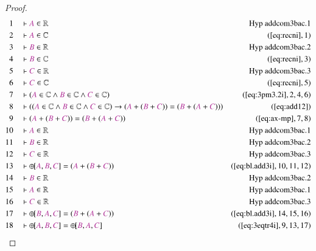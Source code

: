 \begin{proof}
\begin{align}
  1 &&  & \vdash \mc{A} \in
\mathbb{R}&\text{Hyp~addcom3bac.1}\notag%
  \\ 2 &&  & \vdash \mc{A} \in \mathbb{C}&(\mbox{\ref{eq:recni}},1)\notag
  \\ 3 &&  & \vdash \mc{B} \in
\mathbb{R}&\text{Hyp~addcom3bac.2}\notag%
  \\ 4 &&  & \vdash \mc{B} \in \mathbb{C}&(\mbox{\ref{eq:recni}},3)\notag
  \\ 5 &&  & \vdash \mc{C} \in
\mathbb{R}&\text{Hyp~addcom3bac.3}\notag%
  \\ 6 &&  & \vdash \mc{C} \in \mathbb{C}&(\mbox{\ref{eq:recni}},5)\notag
  \\ 7 &&  & \vdash ( \mc{A} \in \mathbb{C} \wedge \mc{B} \in \mathbb{C} \wedge
      \mc{C} \in \mathbb{C}
      )&(\mbox{\ref{eq:3pm3.2i}},2,4,6)\notag
  \\ 8 &&  & \vdash ( ( \mc{A} \in \mathbb{C} \wedge \mc{B} \in \mathbb{C}
      \wedge \mc{C} \in \mathbb{C} ) \rightarrow ( \mc{A} +
      ( \mc{B} + \mc{C} ) ) = ( \mc{B} + ( \mc{A} + \mc{C}
      ) ) )&(\mbox{\ref{eq:add12}})\notag
  \\ 9 &&  & \vdash ( \mc{A} + ( \mc{B} + \mc{C} ) ) = ( \mc{B} + ( \mc{A} +
      \mc{C} ) )&(\mbox{\ref{eq:ax-mp}},7,8)\notag
  \\ 10 &&  & \vdash \mc{A} \in
\mathbb{R}&\text{Hyp~addcom3bac.1}\notag%
  \\ 11 &&  & \vdash \mc{B} \in
\mathbb{R}&\text{Hyp~addcom3bac.2}\notag%
  \\ 12 &&  & \vdash \mc{C} \in
\mathbb{R}&\text{Hyp~addcom3bac.3}\notag%
  \\ 13 &&  & \vdash {\oplus\hspace{-1pt}[} \mc{A} , \mc{B} , \mc{C} ] = (
      \mc{A} + ( \mc{B} + \mc{C} )
      )&(\mbox{\ref{eq:bl.add3i}},10,11,12)\notag
  \\ 14 &&  & \vdash \mc{B} \in
\mathbb{R}&\text{Hyp~addcom3bac.2}\notag%
  \\ 15 &&  & \vdash \mc{A} \in
\mathbb{R}&\text{Hyp~addcom3bac.1}\notag%
  \\ 16 &&  & \vdash \mc{C} \in
\mathbb{R}&\text{Hyp~addcom3bac.3}\notag%
  \\ 17 &&  & \vdash {\oplus\hspace{-1pt}[} \mc{B} , \mc{A} , \mc{C} ] = (
      \mc{B} + ( \mc{A} + \mc{C} )
      )&(\mbox{\ref{eq:bl.add3i}},14,15,16)\notag
  \\ 18 &&  & \vdash {\oplus\hspace{-1pt}[} \mc{A} , \mc{B} , \mc{C} ] =
      {\oplus\hspace{-1pt}[} \mc{B} , \mc{A} , \mc{C}
      ]&(\mbox{\ref{eq:3eqtr4i}},9,13,17)\notag
\end{align}
\end{proof}

